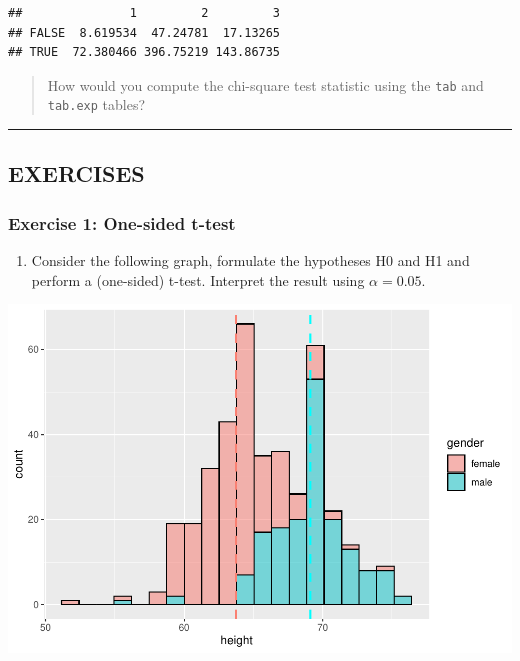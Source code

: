 \documentclass[
]{book}
\providecommand{\tightlist}{%
  \setlength{\itemsep}{0pt}\setlength{\parskip}{0pt}}
\begin{document}
\begin{verbatim}
##               1         2         3
## FALSE  8.619534  47.24781  17.13265
## TRUE  72.380466 396.75219 143.86735
\end{verbatim}

\begin{quote}
How would you compute the chi-square test statistic using the \texttt{tab} and \texttt{tab.exp} tables?
\end{quote}

\begin{center}\rule{0.5\linewidth}{0.5pt}\end{center}

\hypertarget{exercises-3}{%
\subsection{EXERCISES}\label{exercises-3}}

\hypertarget{exercise-1-one-sided-t-test}{%
\subsubsection{Exercise 1: One-sided t-test}\label{exercise-1-one-sided-t-test}}

\begin{enumerate}
\def\labelenumi{\arabic{enumi}.}
\tightlist
\item
  Consider the following graph, formulate the hypotheses H0 and H1 and perform a (one-sided) t-test.
  Interpret the result using \(\alpha=0.05\).
\end{enumerate}

\includegraphics{_main_files/figure-latex/unnamed-chunk-143-1.pdf}
\end{document}
